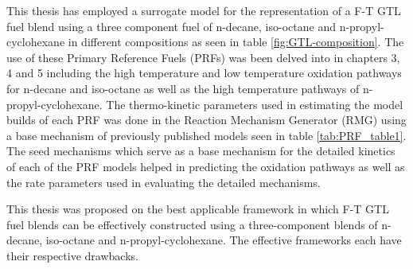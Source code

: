 This thesis has employed a surrogate model for the representation of a F-T GTL fuel blend using a three component fuel of n-decane, iso-octane and n-propyl-cyclohexane in different compositions as seen in table \ref{fig:GTL-composition}. The use of these Primary Reference Fuels (PRFs) was been delved into in chapters 3, 4 and 5 including the high temperature and low temperature oxidation pathways for n-decane and iso-octane as well as the high temperature pathways of n-propyl-cyclohexane. The thermo-kinetic parameters used in estimating the model builds of each PRF was done in the Reaction Mechanism Generator (RMG) \cite{Gao2016ReactionMechanisms} using a base mechanism of previously published models seen in table \ref{tab:PRF_table1}. The seed mechanisms which serve as a base mechanism for the detailed kinetics of each of the PRF models helped in predicting the oxidation pathways as well as the rate parameters used in evaluating the detailed mechanisms. 

This thesis was proposed on the best applicable framework in which F-T GTL fuel blends can be effectively constructed using a three-component blends of n-decane, iso-octane and n-propyl-cyclohexane. The effective frameworks each have their respective drawbacks. 


